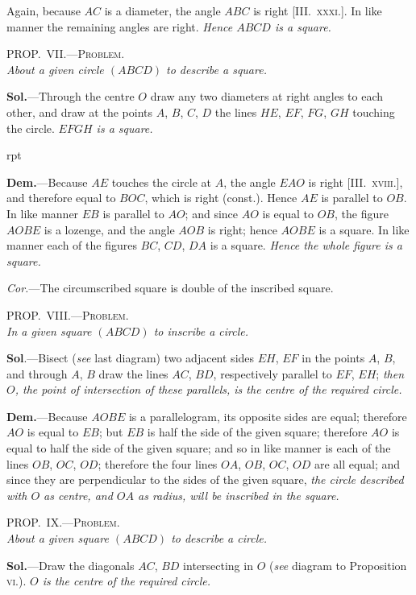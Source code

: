 \documentclass[oneside]{book}
\newcounter{wrapwidth}
\newcommand\myprop[2]{
\bigskip\Needspace*{4\baselineskip}\begin{center}\textsc{#1}\\\medskip\emph{#2}\par\end{center}
}
\newcommand\imgflow[3]{
\setcounter{wrapwidth}{#1}

\begin{wrapfigure}[#2]{r}{\value{wrapwidth}pt}
\begin{center}
\vspace{-0.3in}

\end{center}
\end{wrapfigure}
}
\begin{document}
Again, because $AC$ is a diameter, the angle $ABC$
is right [\textsc{III\@.~xxxi.}]. In like manner the remaining
angles are right. \emph{Hence $ABCD$ is a square.}

\myprop{PROP\@.~VII\@.---Problem.}{About a given circle $(ABCD)$ to describe a square.}

\textbf{Sol.}---Through the centre $O$ draw any two diameters
at right angles to each other, and draw at the points
$A$, $B$, $C$, $D$ the lines $HE$, $EF$, $FG$, $GH$ touching the
circle. \emph{$EFGH$ is a square.}



\imgflow{120}{10}{f161}

\textbf{Dem.}---Because $AE$ touches the circle at $A$, the angle
$EAO$ is right [\textsc{III\@.~xviii.}], and
therefore equal to $BOC$, which
is right (const.). Hence $AE$ is
parallel to $OB$. In like manner
$EB$ is parallel to $AO$; and since
$AO$ is equal to $OB$, the figure
$AOBE$ is a lozenge, and the angle
$AOB$ is right; hence $AOBE$ is a
square. In like manner each of
the figures $BC$, $CD$, $DA$ is a
square. \emph{Hence the whole figure is a square.}

\emph{Cor.}---The circumscribed square is double of the inscribed
square.

\myprop{PROP\@.~VIII\@.---Problem.}{In a given square $(ABCD)$ to inscribe a circle.}

\textbf{Sol}.---Bisect (\emph{see} last diagram) two adjacent sides
$EH$, $EF$ in the points $A$, $B$, and through $A$, $B$ draw
the lines $AC$, $BD$, respectively parallel to $EF$, $EH$;
\emph{then $O$, the point of intersection of these parallels, is the
centre of the required circle.}

\textbf{Dem.}---Because $AOBE$ is a parallelogram, its opposite
sides are equal; therefore $AO$ is equal to $EB$; but
$EB$ is half the side of the given square; therefore $AO$
is equal to half the side of the given square; and so in
like manner is each of the lines $OB$, $OC$, $OD$; therefore
the four lines $OA$, $OB$, $OC$, $OD$ are all equal; and since
they are perpendicular to the sides of the given square,
\emph{the circle described with $O$ as centre, and $OA$ as radius,
will be inscribed in the square.}

\myprop{PROP\@.~IX\@.---Problem.}{About a given square\label{circlesquare} $(ABCD)$ to describe a circle.}

\textbf{Sol.}---Draw the diagonals $AC$, $BD$ intersecting in $O$
(\emph{see} diagram to Proposition \textsc{vi.}). \emph{$O$ is the centre of the
required circle.}
\end{document}
